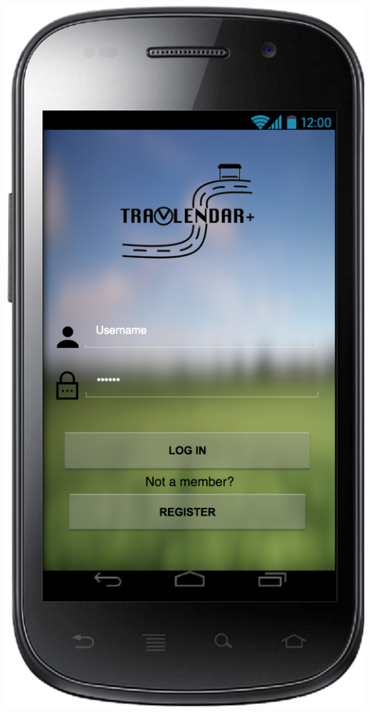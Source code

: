 \documentclass[a4paper,leqno]{article}
\begin{document}
\begin{minipage}[!t]{.5\linewidth}
	\begin{center}
		\includegraphics[scale = 0.15]{access.png}
	\end{center}
\end{minipage}
\end{document}
